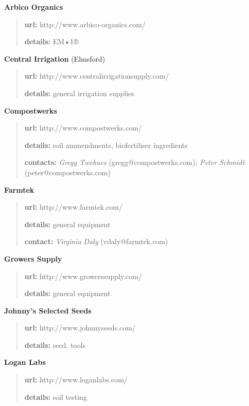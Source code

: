 \textbf{Arbico Organics}

\begin{quote}
\textbf{url:} http://www.arbico-organics.com/

\textbf{details:} EM•1®
\end{quote}

\textbf{Central Irrigation} (Elmsford)

\begin{quote}
\textbf{url:} http://www.centralirrigationsupply.com/

\textbf{details:} general irrigation supplies
\end{quote}

\textbf{Compostwerks}

\begin{quote}
\textbf{url:} http://www.compostwerks.com/

\textbf{details:} soil ammendments, biofertiliser ingredients

\textbf{contacts:} \emph{Gregg Twehues} (gregg@compostwerks.com);
\emph{Peter Schmidt} (peter@compostwerks.com)
\end{quote}

\textbf{Farmtek}

\begin{quote}
\textbf{url:} http://www.farmtek.com/

\textbf{details:} general equipment

\textbf{contact:} \emph{Virginia Daly} (vdaly@farmtek.com)
\end{quote}

\textbf{Growers Supply}

\begin{quote}
\textbf{url:} http://www.growerssupply.com/

\textbf{details:} general equipment
\end{quote}

\textbf{Johnny's Selected Seeds}

\begin{quote}
\textbf{url:} http://www.johnnyseeds.com/

\textbf{details:} seed, tools
\end{quote}

\textbf{Logan Labs}

\begin{quote}
\textbf{url:} http://www.loganlabs.com/

\textbf{details:} soil testing
\end{quote}

